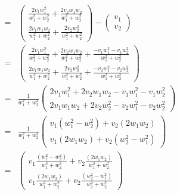 \documentclass[12pt]{article}
\newenvironment{problem}[2][Problem]
{
	\begin{trivlist} 
		\item[\hskip \labelsep {\bfseries #1 #2:}]
	}
{
	\end{trivlist}
	}
\newenvironment{solution}[1][Solution]
{
	\begin{trivlist} 
		\item[\hskip \labelsep {\itshape #1:}]
	}
	{
	\end{trivlist}
}
\begin{document}
\begin{problem}{4}
\begin{solution}
\begin{align*}
=& \begin{pmatrix} \frac{2v_{1}w_{1}^2}{w_{1}^2 +w_{2}^2} + \frac{2v_{2}w_{1}w_{2}}{w_{1}^2 +w_{2}^2}\\ \frac{2v_{1}w_{1}w_{2}}{w_{1}^2 +w_{2}^2} + \frac{2v_{2}w_{2}^2}{w_{1}^2 +w_{2}^2} \end{pmatrix} - \begin{pmatrix} v_{1}\\ v_{2} \end{pmatrix} &\\
=& \begin{pmatrix} \frac{2v_{1}w_{1}^2}{w_{1}^2 +w_{2}^2} + \frac{2v_{2}w_{1}w_{2}}{w_{1}^2 +w_{2}^2} + \frac{- v_{1}w_{1}^2 -v_{1}w_{2}^2}{w_{1}^2 +w_{2}^2}\\ \frac{2v_{1}w_{1}w_{2}}{w_{1}^2 +w_{2}^2} + \frac{2v_{2}w_{2}^2}{w_{1}^2 +w_{2}^2} +\frac{- v_{2}w_{1}^2 -v_{2}w_{2}^2}{w_{1}^2 +w_{2}^2}\end{pmatrix}&\\
=&\frac{1}{w_{1}^2 + w_{2}^2} \begin{pmatrix} 2v_{1}w_{1}^2 + 2v_{2}w_{1}w_{2} - v_{1}w_{1}^2 -v_{1}w_{2}^2\\  2v_{1}w_{1}w_{2} + 2v_{2}w_{2}^2 - v_{2}w_{1}^2 -v_{2}w_{2}^2\end{pmatrix} &\\
=&\frac{1}{w_{1}^2 + w_{2}^2} \begin{pmatrix} v_{1}(w_{1}^2 - w_{2}^2) + v_{2}(2w_{1}w_{2}) \\  v_{1}(2w_{1}w_{2}) + v_{2}(w_{2}^2 - w_{1}^2) \end{pmatrix} &\\
=&\begin{pmatrix} v_{1}\frac{(w_{1}^2 - w_{2}^2)}{w_{1}^2 + w_{2}^2}  + v_{2}\frac{(2w_{1}w_{2})}{w_{1}^2 + w_{2}^2}  \\  v_{1}\frac{(2w_{1}w_{2})}{w_{1}^2 + w_{2}^2}  + v_{2}\frac{(w_{2}^2 - w_{1}^2)}{w_{1}^2 + w_{2}^2}  \end{pmatrix} &\\

\end{align*}
\end{solution}
\end{problem}
\end{document}
